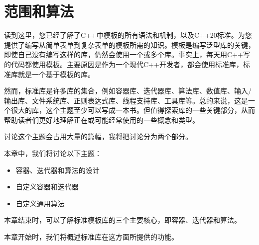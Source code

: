 \chapter{范围和算法}
读到这里，您已经了解了C++中模板的所有语法和机制，以及C++20标准。为您提供了编写从简单表单到复杂表单的模板所需的知识。模板是编写泛型库的关键，即使自己没有编写这样的库，仍然会使用一个或多个库。事实上，每天用C++写的代码都使用模板。主要原因是作为一个现代C++开发者，都会使用标准库，标准库就是一个基于模板的库。

然而，标准库是许多库的集合，例如容器库、迭代器库、算法库、数值库、输入/输出库、文件系统库、正则表达式库、线程支持库、工具库等。总的来说，这是一个很大的库，这个主题至少可以写成一本书。但值得探索库的一些关键部分，从而帮助读者们更好地理解正在或可能经常使用的一些概念和类型。

讨论这个主题会占用大量的篇幅，我将把讨论分为两个部分。

本章中，我们将讨论以下主题：

\begin{itemize}
  \item 容器、迭代器和算法的设计
  \item 自定义容器和迭代器
  \item 自定义通用算法
\end{itemize}

本章结束时，可以了解标准模板库的三个主要核心，即容器、迭代器和算法。

本章开始时，我们将概述标准库在这方面所提供的功能。





